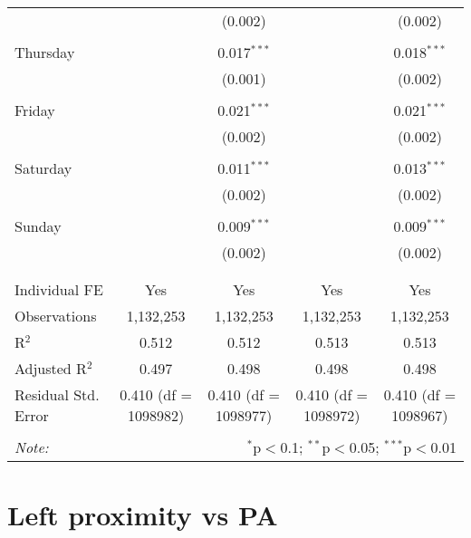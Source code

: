 \documentclass[
]{article}
\begin{document}
\begin{table}[!htbp]
{\begin{tabular}{@{\extracolsep{5pt}}lcccc}
  &  & (0.002) &  & (0.002) \\ 
  & & & & \\ 
 Thursday &  & 0.017$^{***}$ &  & 0.018$^{***}$ \\ 
  &  & (0.001) &  & (0.002) \\ 
  & & & & \\ 
 Friday &  & 0.021$^{***}$ &  & 0.021$^{***}$ \\ 
  &  & (0.002) &  & (0.002) \\ 
  & & & & \\ 
 Saturday &  & 0.011$^{***}$ &  & 0.013$^{***}$ \\ 
  &  & (0.002) &  & (0.002) \\ 
  & & & & \\ 
 Sunday &  & 0.009$^{***}$ &  & 0.009$^{***}$ \\ 
  &  & (0.002) &  & (0.002) \\ 
  & & & & \\ 
\hline \\[-1.8ex] 
Individual FE & Yes & Yes & Yes & Yes \\ 
Observations & 1,132,253 & 1,132,253 & 1,132,253 & 1,132,253 \\ 
R$^{2}$ & 0.512 & 0.512 & 0.513 & 0.513 \\ 
Adjusted R$^{2}$ & 0.497 & 0.498 & 0.498 & 0.498 \\ 
Residual Std. Error & 0.410 (df = 1098982) & 0.410 (df = 1098977) & 0.410 (df = 1098972) & 0.410 (df = 1098967) \\ 
\hline 
\hline \\[-1.8ex] 
\textit{Note:}  & \multicolumn{4}{r}{$^{*}$p$<$0.1; $^{**}$p$<$0.05; $^{***}$p$<$0.01} \\ 
\end{tabular}
} 
\end{table} 
\newpage
\section{Left proximity vs PA}
\end{document}
